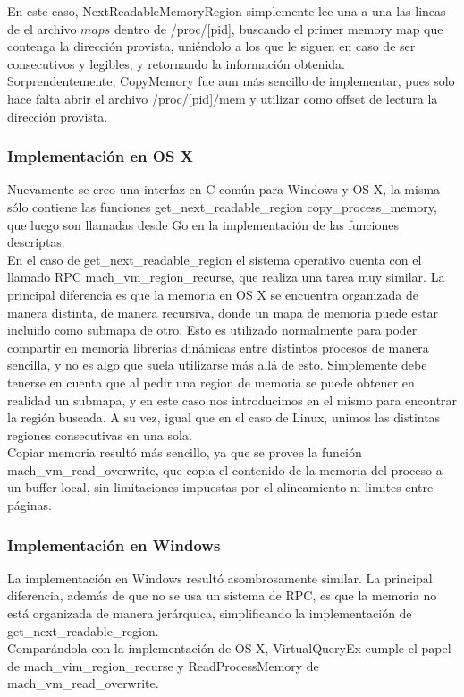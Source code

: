 En este caso, NextReadableMemoryRegion simplemente lee una a una las lineas de
el archivo $maps$ dentro de /proc/[pid], buscando el primer memory map que
contenga la dirección provista, uniéndolo a los que le siguen en caso de ser
consecutivos y legibles, y retornando la información obtenida.\\

Sorprendentemente, CopyMemory fue aun más sencillo de implementar, pues solo
hace falta abrir el archivo /proc/[pid]/mem y utilizar como offset de lectura
la dirección provista.\\

\subsubsection{Implementación en OS X}

Nuevamente se creo una interfaz en C común para Windows y OS X, la misma sólo
contiene las funciones get\_next\_readable\_region copy\_process\_memory, que
luego son llamadas desde Go en la implementación de las funciones descriptas.\\

En el caso de get\_next\_readable\_region el sistema operativo cuenta con el
llamado RPC mach\_vm\_region\_recurse, que realiza una tarea muy similar. La
principal diferencia es que la memoria en OS X se encuentra organizada de
manera distinta, de manera recursiva, donde un mapa de memoria puede estar
incluido como submapa de otro. Esto es utilizado normalmente para poder
compartir en memoria librerías dinámicas entre distintos procesos de
manera sencilla, y no es algo que suela utilizarse más allá de esto.
Simplemente debe tenerse en cuenta que al pedir una region de memoria se puede
obtener en realidad un submapa, y en este caso nos introducimos en el mismo
para encontrar la región buscada. A su vez, igual que en el caso de Linux,
unimos las distintas regiones consecutivas en una sola.\\

Copiar memoria resultó más sencillo, ya que se provee la función
mach\_vm\_read\_overwrite, que copia el contenido de la memoria del proceso a
un buffer local, sin limitaciones impuestas por el alineamiento ni limites
entre páginas.

\subsubsection{Implementación en Windows}

La implementación en Windows resultó asombrosamente similar. La principal
diferencia, además de que no se usa un sistema de RPC, es que la memoria no
está organizada de manera jerárquica, simplificando la implementación de
get\_next\_readable\_region.\\

Comparándola con la implementación de OS X, VirtualQueryEx cumple el papel de
mach\_vim\_region\_recurse y ReadProcessMemory de mach\_vm\_read\_overwrite.\\
